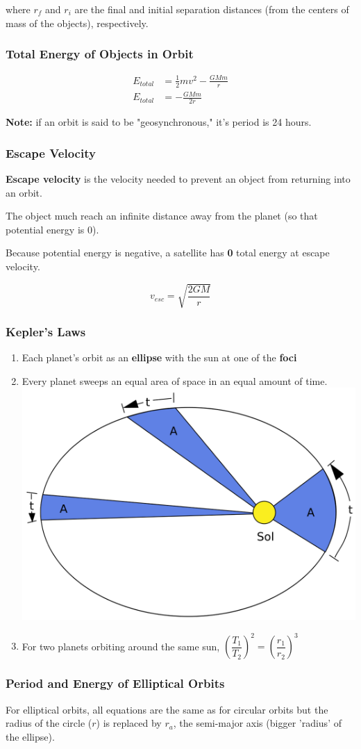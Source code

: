 \documentclass[titlepage]{article}
\begin{document}
where $r_f$ and $r_i$ are the final and initial separation distances (from the centers of mass of the objects), respectively.

\subsubsection{Total Energy of Objects in Orbit}
\begin{align*}
    E_{total} &= \frac{1}{2} mv^2 - \frac{GMm}{r} \\
    E_{total} &= - \frac{GMm}{2r}
\end{align*}

\textbf{Note:} if an orbit is said to be "geosynchronous," it's period is 24 hours.

\subsubsection{Escape Velocity}
\textbf{Escape velocity} is the velocity needed to prevent an object from returning into an orbit.

The object much reach an infinite distance away from the planet (so that potential energy is 0).

Because potential energy is negative, a satellite has \textbf{0} total energy at escape velocity.

\begin{equation*}
    v_{esc} = \sqrt{\frac{2GM}{r}}
\end{equation*}

\subsubsection*{Kepler's Laws}
\begin{enumerate}
    \item Each planet's orbit as an \textbf{ellipse} with the sun at one of the \textbf{foci}
    \item Every planet sweeps an equal area of space in an equal amount of time. \\
    \includegraphics[scale=0.2]{kepler2}
    \item For two planets orbiting around the same sun, $\left( \dfrac{T_1}{T_2} \right)^2 = \left( \dfrac{r_1}{r_2} \right)^3 $
\end{enumerate}

\subsubsection{Period and Energy of Elliptical Orbits}
For elliptical orbits, all equations are the same as for circular orbits but the radius of the circle ($r$) is replaced by $r_a$, the semi-major axis (bigger 'radius' of the ellipse).
\end{document}
